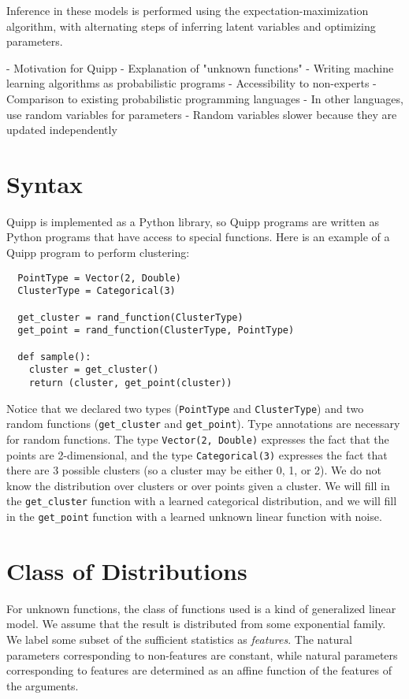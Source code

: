 \documentclass[proceed]{article}
\begin{document}
  Inference in these models is performed using the expectation-maximization
  algorithm, with alternating steps of inferring latent variables and optimizing
  parameters.


  - Motivation for Quipp
    - Explanation of "unknown functions"
    - Writing machine learning algorithms as probabilistic programs
    - Accessibility to non-experts
    - Comparison to existing probabilistic programming languages
      - In other languages, use random variables for parameters
      - Random variables slower because they are updated independently

  \section{Syntax}

  Quipp is implemented as a Python library, so Quipp programs are written as Python programs that have access
  to special functions.  Here is an example of a Quipp program to perform clustering:


  \begin{verbatim}
  PointType = Vector(2, Double)
  ClusterType = Categorical(3)

  get_cluster = rand_function(ClusterType)
  get_point = rand_function(ClusterType, PointType)

  def sample():
    cluster = get_cluster()
    return (cluster, get_point(cluster))
  \end{verbatim}

  Notice that we declared two types (\texttt{PointType} and \texttt{ClusterType})
  and two random functions (\texttt{get\_cluster} and \texttt{get\_point}).
  Type annotations are necessary for random functions.  The type
  \texttt{Vector(2, Double)} expresses the fact that the points are 2-dimensional,
  and the type \texttt{Categorical(3)} expresses the fact that there are 3
  possible clusters (so a cluster may be either 0, 1, or 2).  We do not know
  the distribution over clusters or over points given a cluster.
  We will fill in the \texttt{get\_cluster} function with
  a learned categorical distribution, and we will fill in the
  \texttt{get\_point} function with a learned unknown linear function with noise.

  \section{Class of Distributions}

    For unknown functions, the class of functions used is a kind
    of generalized linear model.  We assume that the result
    is distributed from some exponential family.  We label
    some subset of the sufficient statistics as \emph{features}.  The natural
    parameters corresponding to non-features are constant, while natural
    parameters corresponding to features are determined as an affine
    function of the features of the arguments.
\end{document}
